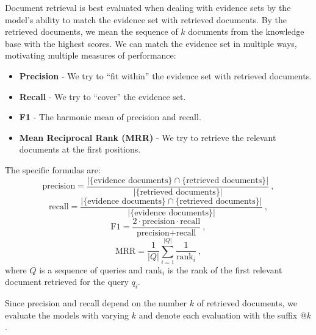 Document retrieval is best evaluated when dealing with evidence sets by the model's ability to match the evidence set with retrieved documents.
By the retrieved documents, we mean the sequence of $k$ documents from the knowledge base with the highest scores.
We can match the evidence set in multiple ways, motivating multiple measures of performance:
\begin{itemize}
    \item \textbf{Precision} - We try to ``fit within'' the evidence set with retrieved documents.
    \item \textbf{Recall} - We try to ``cover'' the evidence set.
    \item \textbf{F1} - The harmonic mean of precision and recall. 
    \item \textbf{Mean Reciprocal Rank (MRR)} \citep{mrr} - We try to retrieve the relevant documents at the first positions. 
\end{itemize}
The specific formulas are: 
\begin{equation}
    \text{precision} = \frac{|\{\text{evidence documents}\}\cap\{\text{retrieved documents}\}|}{|\{\text{retrieved documents}\}|}\ ,
\end{equation}
\begin{equation}
    \text{recall} = \frac{|\{\text{evidence documents}\}\cap\{\text{retrieved documents}\}|}{|\{\text{evidence documents}\}|}\ ,
\end{equation}
\begin{equation}
    \text{F1} = 
    \frac{2\cdot\text{precision}\cdot\text{recall}}{\text{precision}+\text{recall}}\ ,
\end{equation}
\begin{equation}
    \text{MRR} = \frac{1}{|Q|}\sum_{i=1}^{|Q|}{\frac{1}{\text{rank}_i}}\ ,
\end{equation}
where $Q$ is a sequence of queries and $\text{rank}_i$ is the rank of the first relevant document retrieved for the query $q_i$.

Since precision and recall depend on the number $k$ of retrieved documents, we evaluate the models with varying $k$ and denote each evaluation with the suffix $\text{@}k$.